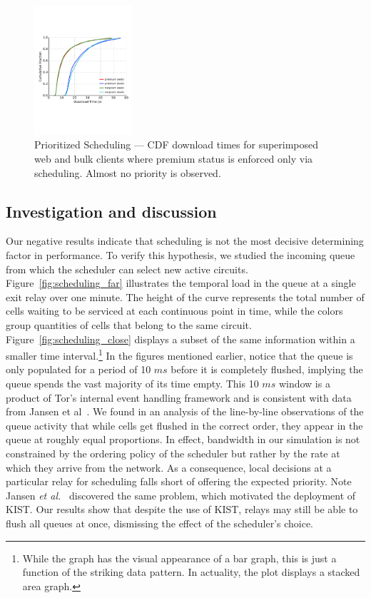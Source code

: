 \begin{figure} \centering
  \includegraphics[trim={0 3cm 0 3cm}, clip,
    width=0.32\textwidth]{images/scheduling_priority.pdf}
  \caption[Prioritized Scheduling]{Prioritized Scheduling --- CDF download times
    for superimposed web and bulk clients where premium status is enforced only
    via scheduling. Almost no priority is observed.}
  \label{fig:scheduling_priority}
\end{figure}

\subsection{Investigation and discussion}

Our negative results indicate that scheduling is not the most decisive determining factor in performance.
To verify this hypothesis, we studied the incoming queue from which the scheduler can select new active circuits.
Figure~\ref{fig:scheduling_far} illustrates the temporal load in the queue at a single exit relay over one minute.
The height of the curve represents the total number of cells waiting to be serviced at each continuous point in time, while the colors group quantities of cells that belong to the same circuit.
Figure~\ref{fig:scheduling_close} displays a subset of the same information within a smaller time interval.\footnote{While the graph has the visual appearance of a bar graph, this is just a function of the striking data pattern.
In actuality, the plot displays a stacked area graph.}
In the figures mentioned earlier, notice that the queue is only populated for a period of 10 $ms$ before it is completely flushed, implying the queue spends the vast majority of its time empty.
This 10 $ms$ window is a product of Tor's internal event handling framework and is consistent with data from Jansen et al~\cite{jansen2018kist}.
We found in an analysis of the line-by-line observations of the queue activity that while cells get flushed in the correct order, they appear in the queue at roughly equal proportions.
In effect, bandwidth in our simulation is not constrained by the ordering policy of the scheduler but rather by the rate at which they arrive from the network.
As a consequence, local decisions at a particular relay for scheduling falls short of offering the expected priority.
Note Jansen \textit{et al.}~\cite{jansen2018kist} discovered the same problem, which motivated the deployment of KIST.
Our results show that despite the use of KIST, relays may still be able to flush all queues at once, dismissing the effect of the scheduler's choice.


